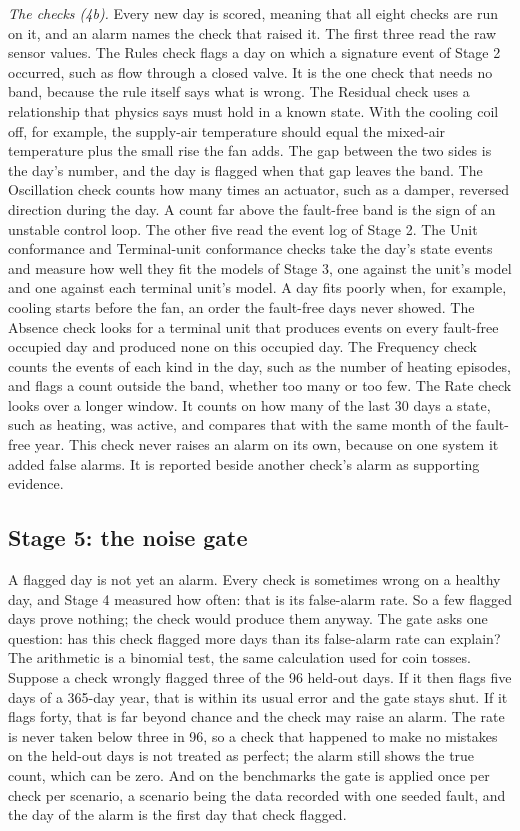 \documentclass[conference]{IEEEtran}
\begin{document}
\emph{The checks (4b).} Every new day is scored, meaning that all eight checks are run on it, and an alarm names the check that raised it. The first three read the raw sensor values. The Rules check flags a day on which a signature event of Stage 2 occurred, such as flow through a closed valve. It is the one check that needs no band, because the rule itself says what is wrong. The Residual check uses a relationship that physics says must hold in a known state. With the cooling coil off, for example, the supply-air temperature should equal the mixed-air temperature plus the small rise the fan adds. The gap between the two sides is the day's number, and the day is flagged when that gap leaves the band. The Oscillation check counts how many times an actuator, such as a damper, reversed direction during the day. A count far above the fault-free band is the sign of an unstable control loop. The other five read the event log of Stage 2. The Unit conformance and Terminal-unit conformance checks take the day's state events and measure how well they fit the models of Stage 3, one against the unit's model and one against each terminal unit's model. A day fits poorly when, for example, cooling starts before the fan, an order the fault-free days never showed. The Absence check looks for a terminal unit that produces events on every fault-free occupied day and produced none on this occupied day. The Frequency check counts the events of each kind in the day, such as the number of heating episodes, and flags a count outside the band, whether too many or too few. The Rate check looks over a longer window. It counts on how many of the last 30 days a state, such as heating, was active, and compares that with the same month of the fault-free year. This check never raises an alarm on its own, because on one system it added false alarms. It is reported beside another check's alarm as supporting evidence.

\subsection{Stage 5: the noise gate}

A flagged day is not yet an alarm. Every check is sometimes wrong on a healthy day, and Stage 4 measured how often: that is its false-alarm rate. So a few flagged days prove nothing; the check would produce them anyway. The gate asks one question: has this check flagged more days than its false-alarm rate can explain? The arithmetic is a binomial test, the same calculation used for coin tosses. Suppose a check wrongly flagged three of the 96 held-out days. If it then flags five days of a 365-day year, that is within its usual error and the gate stays shut. If it flags forty, that is far beyond chance and the check may raise an alarm. The rate is never taken below three in 96, so a check that happened to make no mistakes on the held-out days is not treated as perfect; the alarm still shows the true count, which can be zero. And on the benchmarks the gate is applied once per check per scenario, a scenario being the data recorded with one seeded fault, and the day of the alarm is the first day that check flagged.
\end{document}
